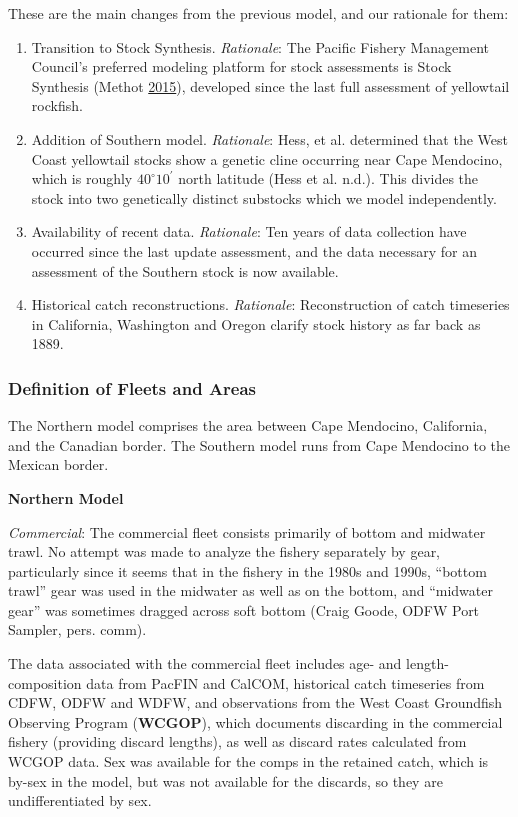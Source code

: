 \documentclass[12pt,]{article}
\begin{document}
These are the main changes from the previous model, and our rationale
for them:

\begin{enumerate}
\def\labelenumi{\arabic{enumi}.}
\item
  Transition to Stock Synthesis. \emph{Rationale}: The Pacific Fishery
  Management Council's preferred modeling platform for stock assessments
  is Stock Synthesis (Methot \protect\hyperlink{ref-Methot2015}{2015}),
  developed since the last full assessment of yellowtail rockfish.
\item
  Addition of Southern model. \emph{Rationale}: Hess, et al. determined
  that the West Coast yellowtail stocks show a genetic cline occurring
  near Cape Mendocino, which is roughly \(40^\circ 10^\prime\) north
  latitude (Hess et al. n.d.). This divides the stock into two
  genetically distinct substocks which we model independently.
\item
  Availability of recent data. \emph{Rationale}: Ten years of data
  collection have occurred since the last update assessment, and the
  data necessary for an assessment of the Southern stock is now
  available.
\item
  Historical catch reconstructions. \emph{Rationale}: Reconstruction of
  catch timeseries in California, Washington and Oregon clarify stock
  history as far back as 1889.
\end{enumerate}

\subsubsection{Definition of Fleets and
Areas}\label{definition-of-fleets-and-areas}

The Northern model comprises the area between Cape Mendocino,
California, and the Canadian border. The Southern model runs from Cape
Mendocino to the Mexican border.

\textbf{Northern Model}

\emph{Commercial}: The commercial fleet consists primarily of bottom and
midwater trawl. No attempt was made to analyze the fishery separately by
gear, particularly since it seems that in the fishery in the 1980s and
1990s, ``bottom trawl'' gear was used in the midwater as well as on the
bottom, and ``midwater gear'' was sometimes dragged across soft bottom
(Craig Goode, ODFW Port Sampler, pers. comm).

The data associated with the commercial fleet includes age- and
length-composition data from PacFIN and CalCOM, historical catch
timeseries from CDFW, ODFW and WDFW, and observations from the West
Coast Groundfish Observing Program (\textbf{WCGOP}), which documents
discarding in the commercial fishery (providing discard lengths), as
well as discard rates calculated from WCGOP data. Sex was available for
the comps in the retained catch, which is by-sex in the model, but was
not available for the discards, so they are undifferentiated by sex.
\end{document}
